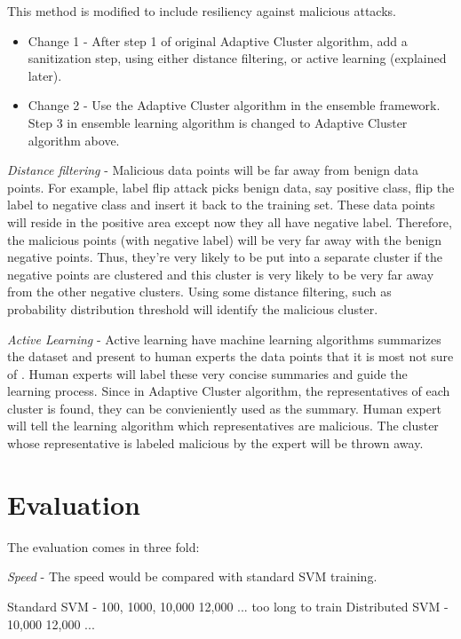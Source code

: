 \documentclass[10pt,conference,compsocconf,letterpaper]{IEEEtran}
\begin{document}
This method is modified to include resiliency against malicious attacks.

\begin{itemize}
\item Change 1 - After step 1 of original Adaptive Cluster algorithm, add a sanitization step, using either distance filtering, or active learning (explained later).
\item Change 2 - Use the Adaptive Cluster algorithm in the ensemble framework. Step 3 in ensemble learning algorithm is changed to Adaptive Cluster algorithm above.
\end{itemize}

\textit{Distance filtering} - Malicious data points will be far away from benign data points. For example, label flip attack \cite{xiao12} picks benign data, say positive class, flip the label to negative class and insert it back to the training set. These data points will reside in the positive area except now they all have negative label. Therefore, the malicious points (with negative label) will be very far away with the benign negative points. Thus, they're very likely to be put into a separate cluster if the negative points are clustered and this cluster is very likely to be very far away from the other negative clusters. Using some distance filtering, such as probability distribution threshold will identify the malicious cluster.

\textit{Active Learning} - Active learning have machine learning algorithms summarizes the dataset and present to human experts the data points that it is most not sure of \cite{reghavan06}. Human experts will label these very concise summaries and guide the learning process. Since in Adaptive Cluster algorithm, the representatives of each cluster is found, they can be convieniently used as the summary. Human expert will tell the learning algorithm which representatives are malicious. The cluster whose representative is labeled malicious by the expert will be thrown away.



\section{Evaluation}

The evaluation comes in three fold:

\textit{Speed} - The speed would be compared with standard SVM training.

Standard SVM	- 100, 1000, 10,000 12,000 ... too long to train
Distributed SVM	- 10,000 12,000 ... 
\end{document}

